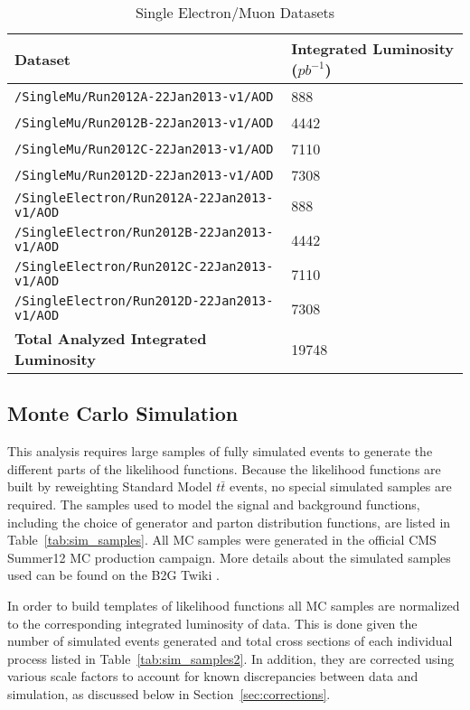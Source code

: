 \begin{table}[h!]
\small
\caption{\small Single Electron/Muon Datasets}
\centering
\begin{tabular}{| p{2.55 cm}  p{8.5 cm}  p{3 cm} |}
\hline

\multicolumn{2}{|l}{\textbf{Dataset}} & \textbf{Integrated Luminosity ($\displaystyle{pb^{-1}}$)}\\[0.5ex]
\hline
\multicolumn{2}{|l}{\texttt{/SingleMu/Run2012A-22Jan2013-v1/AOD}} & 888\\
\multicolumn{2}{|l}{\texttt{/SingleMu/Run2012B-22Jan2013-v1/AOD}} & 4442\\
\multicolumn{2}{|l}{\texttt{/SingleMu/Run2012C-22Jan2013-v1/AOD}} & 7110\\
\multicolumn{2}{|l}{\texttt{/SingleMu/Run2012D-22Jan2013-v1/AOD}} & 7308\\
\multicolumn{2}{|l}{\texttt{/SingleElectron/Run2012A-22Jan2013-v1/AOD}} & 888\\
\multicolumn{2}{|l}{\texttt{/SingleElectron/Run2012B-22Jan2013-v1/AOD}} & 4442\\
\multicolumn{2}{|l}{\texttt{/SingleElectron/Run2012C-22Jan2013-v1/AOD}} & 7110\\
\multicolumn{2}{|l}{\texttt{/SingleElectron/Run2012D-22Jan2013-v1/AOD}} & 7308\\

\hline
\multicolumn{2}{|l}{\textbf{Total Analyzed Integrated Luminosity}} & 19748\\
\hline
\end{tabular}
\label{tab:datasets}
\end{table}


\subsection{Monte Carlo Simulation}

This analysis requires large samples of fully simulated events to generate the different parts of the likelihood functions.  Because the likelihood functions are built by reweighting Standard Model $t\bar t$ events, no special simulated samples are required.  The samples used to model the signal and background functions, including the choice of generator and parton distribution functions, are listed in Table~\ref{tab:sim_samples}. All MC samples were generated in the official CMS Summer12 MC production campaign. More details about the simulated samples used can be found on the B2G Twiki \cite{B2G_twiki}.

In order to build templates of likelihood functions all MC samples are normalized to the corresponding integrated luminosity of data. This is done given the number of simulated events generated and total cross sections of each individual process listed in Table~\ref{tab:sim_samples2}. In addition, they are corrected using various scale factors to account for known discrepancies between data and simulation, as discussed below in Section~\ref{sec:corrections}.

